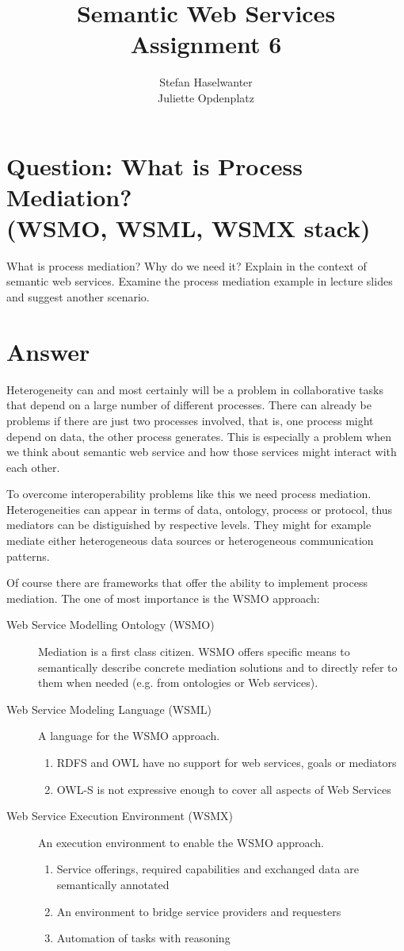 \documentclass[a4paper]{article}
\title{\textbf{Semantic Web Services}\\\large{Assignment 6}}
\author{Stefan Haselwanter\\Juliette Opdenplatz}
\begin{document}
\maketitle

\section{Question: What is Process Mediation?\\(WSMO, WSML, WSMX stack)}

What is process mediation? Why do we need it? Explain in the context of
semantic web services. Examine the process mediation example in lecture slides
and suggest another scenario.

\section{Answer}

Heterogeneity can and most certainly will be a problem in collaborative tasks 
that depend on a large number of different processes.
There can already be problems if there are just two processes involved, 
that is, one process might depend on data, the other process generates.
This is especially a problem when we think about semantic web service
and how those services might interact with each other.

To overcome interoperability problems like this we need process mediation. 
Heterogeneities can appear in terms of data, ontology, process or protocol,
thus mediators can be distiguished by respective levels.
They might for example mediate either heterogeneous data sources 
or heterogeneous communication patterns.

Of course there are frameworks that offer the ability to implement process mediation. 
The one of most importance is the WSMO approach:
\begin{description}
	\item[Web Service Modelling Ontology (WSMO)] Mediation is a first class citizen.
		WSMO offers specific means to semantically describe concrete mediation 
		solutions and to directly refer to them when needed (e.g. from ontologies or Web services).
	\item[Web Service Modeling Language (WSML)] A language for the WSMO approach.
		\begin{enumerate}
			\item RDFS and OWL have no support for web services, goals or mediators
			\item OWL-S is not expressive enough to cover all aspects of Web Services
		\end{enumerate}
	\item[Web Service Execution Environment (WSMX)] An execution environment to enable the WSMO approach.
		\begin{enumerate}
			\item Service offerings, required capabilities and exchanged data are semantically annotated
			\item An environment to bridge service providers and requesters
			\item Automation of tasks with reasoning
		\end{enumerate}
\end{description}
\end{document}
